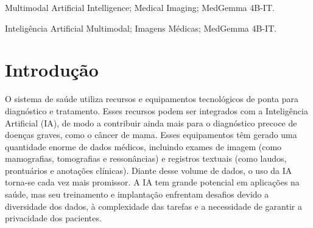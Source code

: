 \documentclass[10pt,conference]{IEEEtran}
\begin{document}
\renewcommand{\IEEEkeywordsname}{Keywords}
\begin{IEEEkeywords}
Multimodal Artificial Intelligence; Medical Imaging; MedGemma 4B-IT.
\end{IEEEkeywords}

\renewcommand{\abstractname}{Resumo}

\begin{abstract}
 O presente estudo investiga o uso da inteligência artificial (IA) multimodal como ferramenta de apoio ao diagnóstico clínico, com ênfase na detecção de achados em mamografias. Para isso, utiliza-se o modelo Google MedGEMMA 4B-IT, uma arquitetura avançada que integra um encoder de imagens médicas (MedSigLIP) com um modelo de linguagem treinado para interpretar terminologia e descrições clínicas complexas. A pesquisa baseia-se em um conjunto real de mamografias e respectivos laudos clínicos, avaliando a capacidade do modelo em associar informações visuais e textuais à classificação correta segundo o sistema BI-RADS. Ao analisar os acertos e limitações da IA, o estudo busca evidenciar seu potencial de apoio à tomada de decisão médica, contribuindo para o desenvolvimento de soluções mais precisas, rápidas e contextualmente informadas, sem substituir o papel essencial da análise humana especializada. Além disso, os resultados fornecem subsídios para futuras etapas de fine-tuning supervisionado, visando aprimorar a sensibilidade do modelo para categorias críticas e reduzir falsos positivos.
\end{abstract}

\renewcommand\IEEEkeywordsname{Palavras-chave}

\begin{IEEEkeywords}
Inteligência Artificial Multimodal; Imagens Médicas; MedGemma 4B-IT.
\end{IEEEkeywords}

\IEEEpeerreviewmaketitle

\section{Introdução} 
O sistema de saúde utiliza recursos e equipamentos tecnológicos de ponta para diagnóstico e tratamento. Esses recursos podem ser integrados com a Inteligência Artificial (IA), de modo a contribuir ainda mais para o diagnóstico precoce de doenças graves, como o câncer de mama. Esses equipamentos têm gerado uma quantidade enorme de dados médicos, incluindo exames de imagem (como mamografias, tomografias e ressonâncias) e registros textuais (como laudos, prontuários e anotações clínicas). Diante desse volume de dados, o uso da IA torna-se cada vez mais promissor. A IA tem grande potencial em aplicações na saúde, mas seu treinamento e implantação enfrentam desafios devido a diversidade dos dados, à complexidade das tarefas e a necessidade de garantir a privacidade dos pacientes\cite{sellergren2025medgemma}.
\end{document}
